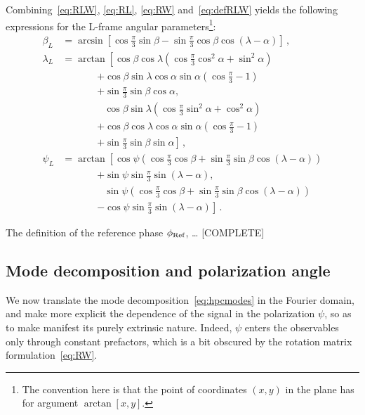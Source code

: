 \documentclass[aps,showpacs,twocolumn,prd,superscriptaddress,nofootinbib]{revtex4-1}
\newcommand{\bsub}{\begin{subequations}}
\newcommand{\esub}{\end{subequations}}
\newcommand{\nn}{\nonumber}
\newcommand{\SM}[1]{{\color{Blue} #1}}
\begin{document}
Combining~\eqref{eq:RLW}, \eqref{eq:RL}, \eqref{eq:RW} and~\eqref{eq:defRLW} yields the following expressions for the L-frame angular parameters\footnote{The convention here is that the point of coordinates $(x,y)$ in the plane has for argument $\arctan\left[ x, y \right]$.}:
\bsub
\begin{align}
	\beta_{L} &= \arcsin \left[ \cos \frac{\pi}{3} \sin \beta - \sin \frac{\pi}{3} \cos \beta \cos \left( \lambda - \alpha \right) \right] \,,\\
	\lambda_{L} &= \arctan \left[ \cos\beta \cos\lambda \left( \cos \frac{\pi}{3} \cos^{2}\alpha + \sin^{2}\alpha \right) \right. \nn\\
	& \qquad\quad\;\; \left. + \cos\beta \sin\lambda \cos\alpha \sin\alpha \left( \cos\frac{\pi}{3} - 1 \right) \right. \nn\\
	& \qquad\quad\;\; \left. + \sin\frac{\pi}{3} \sin\beta \cos\alpha , \right. \nn\\
	& \qquad\qquad\; \left. \cos\beta \sin\lambda \left( \cos \frac{\pi}{3} \sin^{2}\alpha + \cos^{2}\alpha \right) \right. \nn\\
	& \qquad\quad\;\; \left. + \cos\beta \cos\lambda \cos\alpha \sin\alpha \left( \cos\frac{\pi}{3} - 1 \right) \right. \nn\\
	& \qquad\quad\;\; \left. + \sin\frac{\pi}{3} \sin\beta \sin\alpha \right] \,,\\
	\psi_{L} &= \arctan \left[ \cos\psi \left( \cos\frac{\pi}{3}\cos\beta + \sin\frac{\pi}{3} \sin\beta \cos(\lambda - \alpha)\right) \right. \nn\\
	& \qquad\quad\;\; \left. + \sin \psi \sin\frac{\pi}{3} \sin(\lambda - \alpha), \right. \nn\\
	& \qquad\qquad\; \left. \sin\psi \left( \cos\frac{\pi}{3}\cos\beta + \sin\frac{\pi}{3} \sin\beta \cos(\lambda - \alpha)\right) \right. \nn\\
	& \qquad\quad\;\; \left. - \cos \psi \sin\frac{\pi}{3} \sin(\lambda - \alpha) \right] \,.
\end{align}
\esub

The definition of the reference phase $\phi_{\rm Ref}$, \dots \SM{[COMPLETE]}


\subsection{Mode decomposition and polarization angle}
\label{sec:modespol}

We now translate the mode decomposition~\eqref{eq:hpcmodes} in the Fourier domain, and make more explicit the dependence of the signal in the polarization $\psi$, so as to make manifest its purely extrinsic nature. Indeed, $\psi$ enters the observables only through constant prefactors, which is a bit obscured by the rotation matrix formulation~\eqref{eq:RW}.
\end{document}
